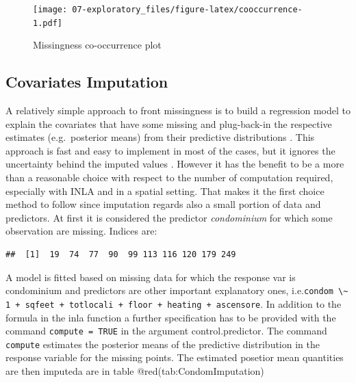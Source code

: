 \documentclass[
  12pt,
  a4paper,
  oneside]{book}
\newcommand{\passthrough}[1]{#1}
\theoremstyle{definition}
\theoremstyle{definition}
\theoremstyle{definition}
\theoremstyle{remark}
\begin{document}
\begin{figure}
\centering
\texttt{[image: 07-exploratory\_files/figure-latex/cooccurrence-1.pdf]}
\caption{\label{fig:cooccurrence}Missingness co-occurrence plot}
\end{figure}

\hypertarget{covariates-imputation}{%
\subsection{Covariates Imputation}\label{covariates-imputation}}

A relatively simple approach to front missingness is to build a regression model to explain the covariates that have some missing and plug-back-in the respective estimates (e.g.~posterior means) from their predictive distributions \citet{Little}. This approach is fast and easy to implement in most of the cases, but it ignores the uncertainty behind the imputed values \citep{Bayesian_INLA_Rubio}. However it has the benefit to be a more than a reasonable choice with respect to the number of computation required, especially with INLA and in a spatial setting. That makes it the first choice method to follow since imputation regards also a small portion of data and predictors. At first it is considered the predictor \emph{condominium} for which some observation are missing. Indices are:

\begin{lstlisting}
##  [1]  19  74  77  90  99 113 116 120 179 249
\end{lstlisting}

A model is fitted based on missing data for which the response var is condominium and predictors are other important explanatory ones, i.e.\passthrough{\lstinline!condom \~ 1 + sqfeet + totlocali + floor + heating + ascensore!}. In addition to the formula in the inla function a further specification has to be provided with the command \passthrough{\lstinline!compute = TRUE!} in the argument control.predictor. The command \passthrough{\lstinline!compute!} estimates the posterior means of the predictive distribution in the response variable for the missing points. The estimated posetior mean quantities are then imputeda are in table @red(tab:CondomImputation)
\end{document}

